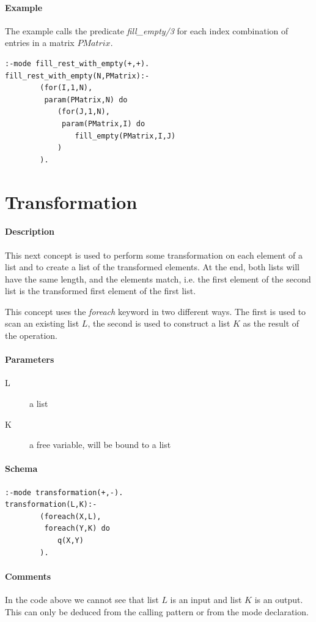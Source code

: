 \documentclass[a4paper,12pt]{report}
\begin{document}
\paragraph{Example}
The example calls the predicate {\it fill\_empty/3} for each index combination of entries in a matrix $PMatrix$.
\begin{verbatim}
:-mode fill_rest_with_empty(+,+).
fill_rest_with_empty(N,PMatrix):-
        (for(I,1,N),
         param(PMatrix,N) do
            (for(J,1,N),
             param(PMatrix,I) do
                fill_empty(PMatrix,I,J)
            )
        ).
\end{verbatim}

\pagebreak
\section{Transformation}
\paragraph{Description}
This next concept is used to perform some transformation on each element of a list and to create a list of the transformed elements. At the end, both lists will have the same length, and the elements match, i.e. the first element of the second list is the transformed first element of the first list. 

This concept uses the {\it foreach} keyword in two different ways. The first is used to scan an existing list $L$, the second is used to construct a list $K$ as the result of the operation.
\paragraph{Parameters}
\begin{description}
\item[L] a list
\item[K] a free variable, will be bound to a list
\end{description}
\paragraph{Schema}
\begin{verbatim}
:-mode transformation(+,-).
transformation(L,K):-
        (foreach(X,L),
         foreach(Y,K) do
            q(X,Y)
        ).
\end{verbatim}
\paragraph{Comments}
In the code above we cannot see that list $L$ is an input and list $K$ is an output. This can only be deduced from the calling pattern or from the mode declaration. 
\end{document}
